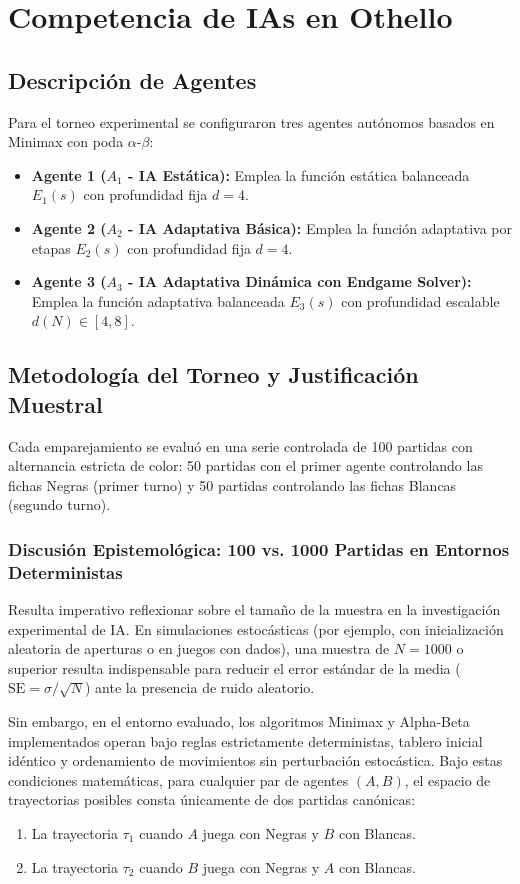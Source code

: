 \documentclass[10pt,a4paper]{article}
\begin{document}
\section{Competencia de IAs en Othello}

\subsection{Descripción de Agentes}
Para el torneo experimental se configuraron tres agentes autónomos basados en Minimax con poda $\alpha$-$\beta$:
\begin{itemize}
    \item \textbf{Agente 1 ($A_1$ - IA Estática):} Emplea la función estática balanceada $E_1(s)$ con profundidad fija $d=4$.
    \item \textbf{Agente 2 ($A_2$ - IA Adaptativa Básica):} Emplea la función adaptativa por etapas $E_2(s)$ con profundidad fija $d=4$.
    \item \textbf{Agente 3 ($A_3$ - IA Adaptativa Dinámica con Endgame Solver):} Emplea la función adaptativa balanceada $E_3(s)$ con profundidad escalable $d(N) \in [4, 8]$.
\end{itemize}

\subsection{Metodología del Torneo y Justificación Muestral}
Cada emparejamiento se evaluó en una serie controlada de 100 partidas con alternancia estricta de color: 50 partidas con el primer agente controlando las fichas Negras (primer turno) y 50 partidas controlando las fichas Blancas (segundo turno).

\subsubsection{Discusión Epistemológica: 100 vs. 1000 Partidas en Entornos Deterministas}
Resulta imperativo reflexionar sobre el tamaño de la muestra en la investigación experimental de IA. En simulaciones estocásticas (por ejemplo, con inicialización aleatoria de aperturas o en juegos con dados), una muestra de $N=1000$ o superior resulta indispensable para reducir el error estándar de la media ($\text{SE} = \sigma / \sqrt{N}$) ante la presencia de ruido aleatorio.

Sin embargo, en el entorno evaluado, los algoritmos Minimax y Alpha-Beta implementados operan bajo reglas estrictamente deterministas, tablero inicial idéntico y ordenamiento de movimientos sin perturbación estocástica. Bajo estas condiciones matemáticas, para cualquier par de agentes $(A, B)$, el espacio de trayectorias posibles consta únicamente de dos partidas canónicas:
\begin{enumerate}
    \item La trayectoria $\tau_1$ cuando $A$ juega con Negras y $B$ con Blancas.
    \item La trayectoria $\tau_2$ cuando $B$ juega con Negras y $A$ con Blancas.
\end{enumerate}
\end{document}
